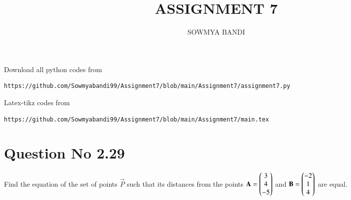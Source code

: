 \documentclass[journal,12pt,twocolumn]{IEEEtran}
\begin{document}
     \def\rightbox#1{\makebox[0in][r]{#1}}
     \def\centbox#1{\makebox[0in]{#1}}
     \def\topbox#1{\raisebox{-\baselineskip}[0in][0in]{#1}}
     \def\midbox#1{\raisebox{-0.5\baselineskip}[0in][0in]{#1}}
\vspace{3cm}
\title{ASSIGNMENT 7}
\author{SOWMYA BANDI}
\maketitle
\newpage
\bigskip
\renewcommand{\thefigure}{\theenumi}
\renewcommand{\thetable}{\theenumi}
Download all python codes from 
\begin{lstlisting}
https://github.com/Sowmyabandi99/Assignment7/blob/main/Assignment7/assignment7.py
\end{lstlisting}
%
Latex-tikz codes from 
%
\begin{lstlisting}
https://github.com/Sowmyabandi99/Assignment7/blob/main/Assignment7/main.tex
\end{lstlisting}
%
\section{Question No 2.29}
Find the equation of the set of points $\vec{P}$ such that its distances from the points $\mathbf{A}=\begin{pmatrix}3 \\ 4 \\ -5\end{pmatrix}$ and $\mathbf{B}=\begin{pmatrix}-2 \\ 1 \\ 4\end{pmatrix}$ are equal.
%
\end{document}

